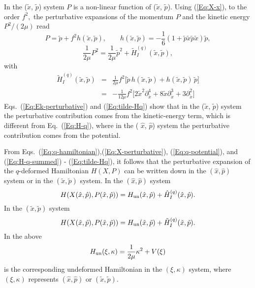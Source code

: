 \documentclass[a4paper,12pt]{article}
\begin{document}
In the  ($\tilde x$, $\tilde p$) system  $P$ is 
a non-linear function of ($\tilde x$, $\tilde p$).
Using (\ref{Eq:X-x}), to the order $f^2,$ the perturbative expansions of
the momentum $P$ and the kinetic energy $P^{2}/(2\mu)$ read 
\begin{equation}
\label{Eq:P-perturbative}
P=\tilde p  + f^2 h(\tilde x ,\tilde p),\qquad
h(\tilde  x,\tilde p)
=-\frac{1}{6}(1+
\tilde  p\tilde x\tilde  p\tilde x )\tilde p,
\end{equation} 
\begin{equation}
\label{Eq:Ek-perturbative}
\frac{1}{2\mu}P^{2}=\frac{1}{2\mu}\tilde p^{2}+
\tilde H^{(q)}_I(\tilde x,\tilde p), 
\end{equation} 
with
\begin{eqnarray}
\label{Eq:tilde-Hq}
\tilde H^{(q)}_I(\tilde x,\tilde p)&=& \frac{1}{2\mu}f^2
\bigl[\tilde p\, h(\tilde  x,\tilde p)
+h(\tilde  x,\tilde p)\, \tilde p\bigr] 
\nonumber\\
&=& -\frac{1}{12\mu}f^2 \bigl[ 2\tilde x^2 \partial_{\tilde x}^4+
8\tilde x  \partial_{\tilde x}^3+
3\partial_{\tilde x}^2 \bigr]
\end{eqnarray}
Eqs.~(\ref{Eq:Ek-perturbative}) and (\ref{Eq:tilde-Hq}) show that in the 
($\tilde x$,$ $ $\tilde p$) system the perturbative contribution comes 
from the  kinetic-energy term, which is different from Eq.~(\ref{Eq:H-q}),
 where in the ( $\hat x$, $\hat p$) system the perturbative contribution 
comes from the potential.

From Eqs.~(\ref{Eq:q-hamiltonian}),(\ref{Eq:X-perturbative}),
 (\ref{Eq:q-potential}), and (\ref{Eq:H-q-summed}) -
(\ref{Eq:tilde-Hq}),
it follows that the perturbative expansion of the $q$-deformed Hamiltonian 
$H(X,P)$ can be written down in the  $(\hat x,\hat p)$ system 
or in the $(\tilde  x,\tilde p)$ system. In  the  $(\hat x,\hat p)$ system 
\begin{equation}                         
\label{Eq:hat-H}  
H(X(\hat x,\hat p),P(\hat x,\hat p))=H_{\rm un}(\hat x,\hat p)+
\hat H^{(q)}_I (\hat x,\hat p).
\end{equation}
In the  $(\tilde  x,\tilde p)$ system
\begin{equation}                         
\label{Eq:tilde-H}  
H(X(\tilde x,\tilde p),P(\tilde x,\tilde p))=H_{\rm un}(\tilde x,\tilde p)
+\tilde H^{(q)}_I (\tilde x,\tilde p).
\end{equation}
In the above
\begin{equation}                          
\label{Eq:xi-Hun}  
H_{\rm un}(\xi,\kappa)=\frac{1}{2\mu}\kappa^{2}+V(\xi)
\end{equation}
is the corresponding undeformed Hamiltonian in the $(\xi,\kappa)$ system,
where $(\xi,\kappa)$ represents 
$(\hat x,\hat p)$ or $(\tilde  x,\tilde p)$. 
\end{document}
